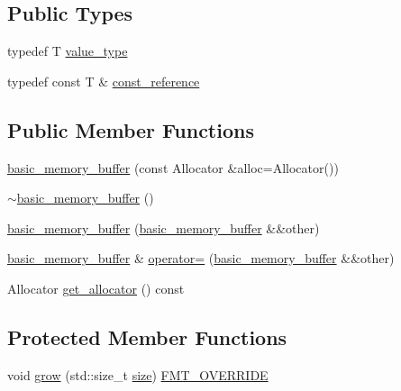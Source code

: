 \subsection*{Public Types}
\begin{DoxyCompactItemize}
\item 
typedef T \hyperlink{classbasic__memory__buffer_a6fa8bfb99b3da095c3849c91b0741f73}{value\+\_\+type}
\item 
typedef const T \& \hyperlink{classbasic__memory__buffer_a4b506ce1f0e45eab07a90eb38ce6089a}{const\+\_\+reference}
\end{DoxyCompactItemize}
\subsection*{Public Member Functions}
\begin{DoxyCompactItemize}
\item 
\hyperlink{classbasic__memory__buffer_af6f3373ae1ecc2104f3074fadccb3c28}{basic\+\_\+memory\+\_\+buffer} (const Allocator \&alloc=Allocator())
\item 
\hyperlink{classbasic__memory__buffer_a05e9c75571c728ebcf299c6670f12569}{$\sim$basic\+\_\+memory\+\_\+buffer} ()
\item 
\hyperlink{classbasic__memory__buffer_a981f02b3da4bdd36d32c065369c66f7d}{basic\+\_\+memory\+\_\+buffer} (\hyperlink{classbasic__memory__buffer}{basic\+\_\+memory\+\_\+buffer} \&\&other)
\item 
\hyperlink{classbasic__memory__buffer}{basic\+\_\+memory\+\_\+buffer} \& \hyperlink{classbasic__memory__buffer_ae03c16a826d5ebaf1754467f40d0b7ba}{operator=} (\hyperlink{classbasic__memory__buffer}{basic\+\_\+memory\+\_\+buffer} \&\&other)
\item 
Allocator \hyperlink{classbasic__memory__buffer_aad7b7f524c4c1301f5a88e54cc68e352}{get\+\_\+allocator} () const
\end{DoxyCompactItemize}
\subsection*{Protected Member Functions}
\begin{DoxyCompactItemize}
\item 
void \hyperlink{classbasic__memory__buffer_a2f01489b9805a99cdc93ab0aee6730eb}{grow} (std\+::size\+\_\+t \hyperlink{classinternal_1_1basic__buffer_abc95713c3873c5820f10105fe7c7af93}{size}) \hyperlink{core_8h_a023c6c178e254d81d578b90921804b1c}{F\+M\+T\+\_\+\+O\+V\+E\+R\+R\+I\+DE}
\end{DoxyCompactItemize}


